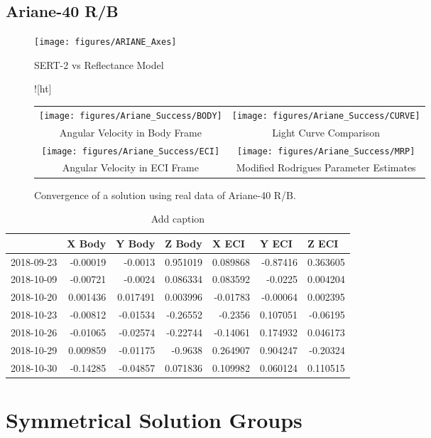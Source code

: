 \subsection{Ariane-40 R/B}

\begin{figure}[ht]
 \texttt{[image: figures/ARIANE\_Axes]}
\caption{SERT-2 vs Reflectance Model}
\end{figure}

\begin{figure}![ht]
	\begin{tabular}{cc}
		\texttt{[image: figures/Ariane\_Success/BODY]} &
		\texttt{[image: figures/Ariane\_Success/CURVE]} \\
		Angular Velocity in Body Frame & Light Curve Comparison \\
		\texttt{[image: figures/Ariane\_Success/ECI]} &
		\texttt{[image: figures/Ariane\_Success/MRP]} \\
		Angular Velocity in ECI Frame & Modified Rodrigues Parameter Estimates
	\end{tabular}
	\caption{Convergence of a solution using real data of Ariane-40 R/B.}
\end{figure}

\begin{table}[htbp]
	\centering
	
	\begin{tabular}{lrrrrrr}
		\hline & \multicolumn{1}{l}{X Body} & \multicolumn{1}{l}{Y Body} & \multicolumn{1}{l}{Z Body} & \multicolumn{1}{l}{X ECI} & \multicolumn{1}{l}{Y ECI} & \multicolumn{1}{l}{Z ECI} \\
		\hline 2018-09-23 & -0.00019 & -0.0013 & 0.951019 & 0.089868 & -0.87416 & 0.363605 \\
		\hline 2018-10-09 & -0.00721 & -0.0024 & 0.086334 & 0.083592 & -0.0225 & 0.004204 \\
		\hline 2018-10-20 & 0.001436 & 0.017491 & 0.003996 & -0.01783 & -0.00064 & 0.002395 \\
		\hline 2018-10-23 & -0.00812 & -0.01534 & -0.26552 & -0.2356 & 0.107051 & -0.06195 \\
		\hline 2018-10-26 & -0.01065 & -0.02574 & -0.22744 & -0.14061 & 0.174932 & 0.046173 \\
		\hline 2018-10-29 & 0.009859 & -0.01175 & -0.9638 & 0.264907 & 0.904247 & -0.20324 \\
		\hline 2018-10-30 & -0.14285 & -0.04857 & 0.071836 & 0.109982 & 0.060124 & 0.110515 \\
		\hline
	\end{tabular}%
	\caption{Add caption}
\end{table}%


\section{Symmetrical Solution Groups}